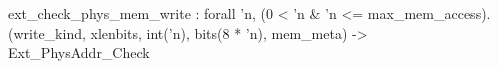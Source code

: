 ext_check_phys_mem_write : forall 'n, (0 < 'n & 'n <= max_mem_access).
  (write_kind, xlenbits, int('n), bits(8 * 'n), mem_meta) -> Ext_PhysAddr_Check